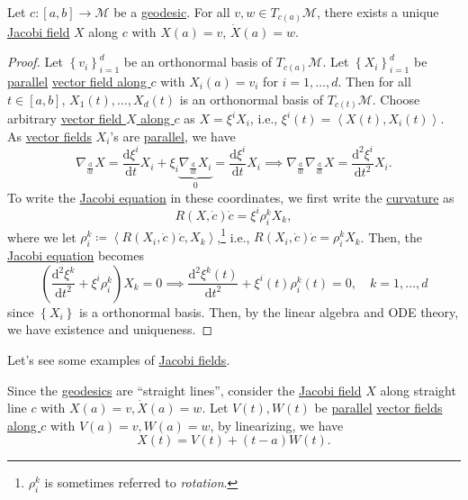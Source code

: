 \begin{theorem}
	Let \(c\colon [a, b] \to \mathcal{M} \) be a \hyperref[def:geodesic]{geodesic}. For all \(v, w\in T_{c(a)}\mathcal{M} \), there exists a unique \hyperref[def:Jacobi-field]{Jacobi field} \(X\) along \(c\) with \(X(a) = v\), \(\dot{X} (a) = w\).
\end{theorem}
\begin{proof}
	Let \(\left\{ v_i \right\} _{i=1}^d\) be an orthonormal basis of \(T_{c(a)} \mathcal{M} \). Let \(\left\{ X_i \right\} _{i=1}^d\) be \hyperref[def:parallel]{parallel} \hyperref[def:vector-field-along-curve]{vector field along \(c\)} with \(X_i(a) = v_i\) for \(i = 1, \dots , d\). Then for all \(t\in [a, b]\), \(X_1(t), \dots , X_d(t)\) is an orthonormal basis of \(T_{c(t)}\mathcal{M} \). Choose arbitrary \hyperref[def:vector-field-along-curve]{vector field \(X\) along \(c\)} as \(X = \xi ^i X_i\), i.e., \(\xi ^i(t) = \left\langle X(t), X_i(t) \right\rangle \). As \hyperref[def:vector-field-along-curve]{vector fields} \(X_i\)'s are \hyperref[def:parallel]{parallel}, we have
	\[
		\nabla _{\frac{\mathrm{d}}{\mathrm{d}t} } X
		= \frac{\mathrm{d}\xi ^i}{\mathrm{d}t} X_i + \xi _i \underbrace{\nabla _{\frac{\mathrm{d}}{\mathrm{d}t} } X_i }_{0}
		= \frac{\mathrm{d}\xi ^i}{\mathrm{d}t} X_i
		\implies \nabla _{\frac{\mathrm{d}}{\mathrm{d}t} }\nabla _{\frac{\mathrm{d}}{\mathrm{d}t} }X = \frac{\mathrm{d}^2 \xi ^i}{\mathrm{d}t^2} X_i .
	\]
	To write the \hyperref[eq:Jacobi]{Jacobi equation} in these coordinates, we first write the \hyperref[def:Riemannian-curvature]{curvature} as
	\[
		R(X, \dot{c} ) \dot{c} = \xi ^i \rho _i^k X_k,
	\]
	where we let \(\rho _i^k \coloneqq \left\langle R(X_i, \dot{c} )\dot{c}, X_k \right\rangle \),\footnote{\(\rho _i^k\) is sometimes referred to \emph{rotation}.} i.e., \(R(X_i, \dot{c} )\dot{c} = \rho _i^k X_k \). Then, the \hyperref[eq:Jacobi]{Jacobi equation} becomes
	\[
		\left( \frac{\mathrm{d}^2 \xi ^k}{\mathrm{d}t^2} + \xi ^i \rho _i^k \right) X_k = 0
		\implies \frac{\mathrm{d}^2 \xi ^k(t)}{\mathrm{d}t^2}  + \xi ^i(t) \rho _i^k(t) = 0,\quad k = 1, \dots , d
	\]
	since \(\left\{ X_i \right\} \) is a orthonormal basis. Then, by the linear algebra and ODE theory, we have existence and uniqueness.
\end{proof}

Let's see some examples of \hyperref[def:Jacobi-field]{Jacobi fields}.

\begin{eg}[\(\mathbb{R} ^n\)]
	Since the \hyperref[def:geodesic]{geodesics} are ``straight lines'', consider the \hyperref[def:Jacobi-field]{Jacobi field} \(X\) along straight line \(c\) with \(X(a) = v, \dot{X}(a) = w\). Let \(V(t), W(t)\) be \hyperref[def:parallel]{parallel} \hyperref[def:vector-field-along-curve]{vector fields along \(c\)} with \(V(a) = v, W(a) = w\), by linearizing, we have
	\[
		X(t) = V(t) + (t-a) W(t).
	\]
\end{eg}


